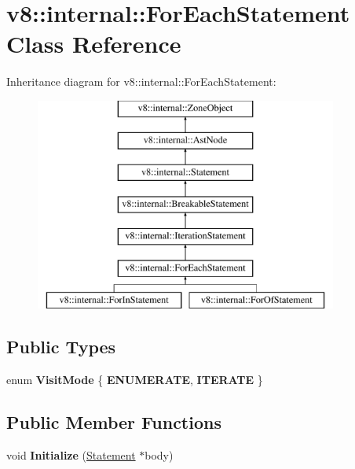 \hypertarget{classv8_1_1internal_1_1ForEachStatement}{}\section{v8\+:\+:internal\+:\+:For\+Each\+Statement Class Reference}
\label{classv8_1_1internal_1_1ForEachStatement}
Inheritance diagram for v8\+:\+:internal\+:\+:For\+Each\+Statement\+:\begin{figure}[H]
\begin{center}
\leavevmode
\includegraphics[height=7.000000cm]{classv8_1_1internal_1_1ForEachStatement}
\end{center}
\end{figure}
\subsection*{Public Types}
\begin{DoxyCompactItemize}
\item 
\mbox{\label{classv8_1_1internal_1_1ForEachStatement_a082216e3ae801be313df6eb024ffa17f}} 
enum {\bfseries Visit\+Mode} \{ {\bfseries E\+N\+U\+M\+E\+R\+A\+TE}, 
{\bfseries I\+T\+E\+R\+A\+TE}
 \}
\end{DoxyCompactItemize}
\subsection*{Public Member Functions}
\begin{DoxyCompactItemize}
\item 
\mbox{\label{classv8_1_1internal_1_1ForEachStatement_a6a313ad237f5b93a69bd3db590872865}} 
void {\bfseries Initialize} (\mbox{\hyperlink{classv8_1_1internal_1_1Statement}{Statement}} $\ast$body)
\end{DoxyCompactItemize}
